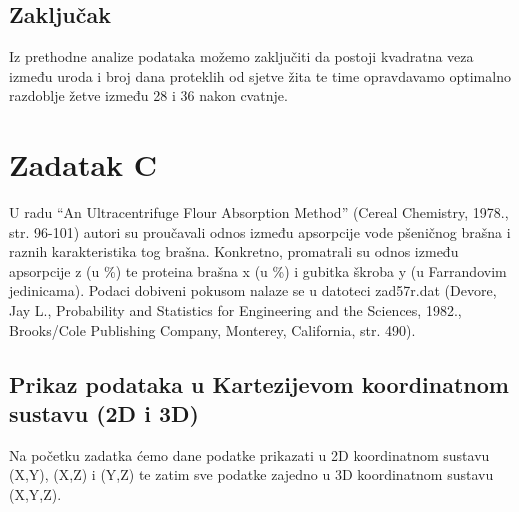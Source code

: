 \documentclass[]{article}
\newenvironment{Shaded}{\begin{snugshade}}{\end{snugshade}}
\newcommand{\KeywordTok}[1]{\textcolor[rgb]{0.13,0.29,0.53}{\textbf{{#1}}}}
\newcommand{\DataTypeTok}[1]{\textcolor[rgb]{0.13,0.29,0.53}{{#1}}}
\newcommand{\StringTok}[1]{\textcolor[rgb]{0.31,0.60,0.02}{{#1}}}
\newcommand{\OtherTok}[1]{\textcolor[rgb]{0.56,0.35,0.01}{{#1}}}
\newcommand{\NormalTok}[1]{{#1}}
\begin{document}
\subsection{Zaključak}\label{zakljucak}

Iz prethodne analize podataka možemo zaključiti da postoji kvadratna
veza između uroda i broj dana proteklih od sjetve žita te time
opravdavamo optimalno razdoblje žetve između 28 i 36 nakon cvatnje.

\section{Zadatak C}\label{zadatak-c}

U radu ``An Ultracentrifuge Flour Absorption Method'' (Cereal Chemistry,
1978., str. 96-101) autori su proučavali odnos između apsorpcije vode
pšeničnog brašna i raznih karakteristika tog brašna. Konkretno,
promatrali su odnos između apsorpcije z (u \%) te proteina brašna x (u
\%) i gubitka škroba y (u Farrandovim jedinicama). Podaci dobiveni
pokusom nalaze se u datoteci zad57r.dat (Devore, Jay L., Probability and
Statistics for Engineering and the Sciences, 1982., Brooks/Cole
Publishing Company, Monterey, California, str. 490).

\subsection{Prikaz podataka u Kartezijevom koordinatnom sustavu (2D i
3D)}\label{prikaz-podataka-u-kartezijevom-koordinatnom-sustavu-2d-i-3d}

Na početku zadatka ćemo dane podatke prikazati u 2D koordinatnom sustavu
(X,Y), (X,Z) i (Y,Z) te zatim sve podatke zajedno u 3D koordinatnom
sustavu (X,Y,Z).

\begin{Shaded}
\end{Shaded}
\end{document}
